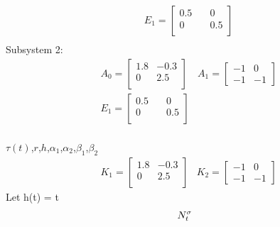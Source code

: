 \documentclass[twocolumn]{autart}    %
\begin{document}
\begin{exmp}
\begin{equation}
\begin{aligned}
            &E_{1} =  \begin{bmatrix}
                0.5 & \quad 0\\
                0 & \quad 0.5\\
            \end{bmatrix}\\
        \end{aligned}
        \nonumber
    \end{equation}
    Subsystem 2:
    \begin{equation}
        \begin{aligned}
            &A_{0} =  \begin{bmatrix}
                1.8 & -0.3\\
                0 & 2.5\\
            \end{bmatrix}
            &A_{1} =  \begin{bmatrix}
                -1 & 0\\
                -1 & -1
            \end{bmatrix}\\
            &E_{1} =  \begin{bmatrix}
                0.5 & \quad 0\\
                0 & \quad 0.5\\
            \end{bmatrix}\\
        \end{aligned}
        \nonumber
    \end{equation}
    
$\tau(t)$,$r$,$h$,$\alpha_{1}$,$\alpha_{2}$,$\beta_{1}$,$\beta_{2}$
\begin{equation}
    \begin{aligned}
        &K_{1} =  \begin{bmatrix}
            1.8 & -0.3\\
            0 & 2.5\\
        \end{bmatrix}
        &K_{2} =  \begin{bmatrix}
            -1 & 0\\
            -1 & -1
        \end{bmatrix}
    \end{aligned}
    \nonumber
\end{equation}
Let h(t) = t
\begin{equation}
    \begin{aligned}
        \setlength{\arraycolsep}{0.9pt}
        N_{t}^{\sigma}
    \end{aligned}
    \nonumber
\end{equation}


\end{exmp}
\end{document}
